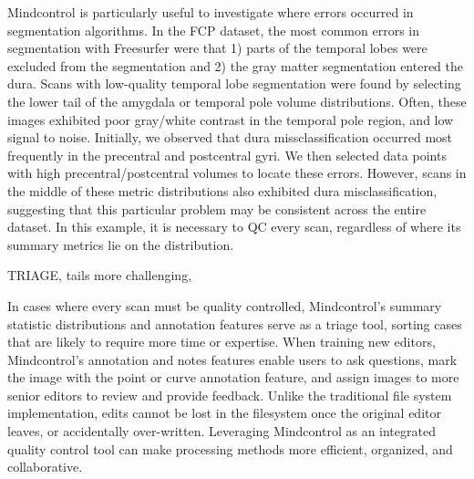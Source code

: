 Mindcontrol is particularly useful to investigate where errors occurred in segmentation algorithms. In the FCP dataset, the most common errors in segmentation with Freesurfer were that 1) parts of the temporal lobes were excluded from the segmentation and 2) the gray matter segmentation entered the dura. Scans with low-quality temporal lobe segmentation were found by selecting the lower tail of the amygdala or temporal pole volume distributions. Often, these images exhibited poor gray/white contrast in the temporal pole region, and low signal to noise. Initially, we observed that dura missclassification occurred most frequently in the precentral and postcentral gyri. We then selected data points with high precentral/postcentral volumes to locate these errors. However, scans in the middle of these metric distributions also exhibited dura misclassification, suggesting that this particular problem may be consistent across the entire dataset. In this example, it is necessary to QC every scan, regardless of where its summary metrics lie on the distribution.  

TRIAGE, tails more challenging, 

In cases where every scan must be quality controlled, Mindcontrol's summary statistic distributions and annotation features serve as a triage tool, sorting cases that are likely to require more time or expertise. When training new editors, Mindcontrol's annotation and notes features enable users to ask questions, mark the image with the point or curve annotation feature, and assign images to more senior editors to review and provide feedback. Unlike the traditional file system implementation, edits cannot be lost in the filesystem once the original editor leaves, or accidentally over-written. Leveraging Mindcontrol as an integrated quality control tool can make processing methods more efficient, organized, and collaborative.



